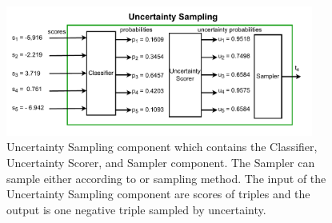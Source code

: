 \begin{figure}[H]
  \centering
    \includegraphics[width=0.90\textwidth]{figures/uncertainty_sampling_component.pdf}
  \caption{Uncertainty Sampling component which contains the Classifier,  Uncertainty Scorer, and  Sampler component. 
  The Sampler can sample either according to \usmax or \ussoftmax sampling method. 
  The input of the Uncertainty Sampling component are scores of triples and the output is one negative triple sampled by uncertainty.}
  \label{fig:uncertainty_sampling_component}
\end{figure}